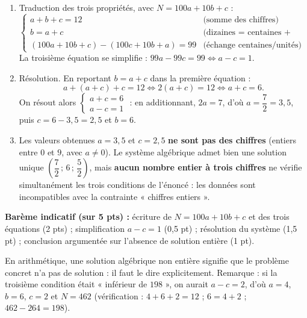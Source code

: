 \documentclass[11pt]{article}
\begin{document}
\begin{corrige}
\begin{enumerate}
\item Traduction des trois propriétés, avec $N = 100a + 10b + c$ :
\[
\begin{cases}
a + b + c = 12 & \text{(somme des chiffres)} \\
b = a + c & \text{(dizaines = centaines + unités)} \\
(100a + 10b + c) - (100c + 10b + a) = 99 & \text{(échange centaines/unités)}
\end{cases}
\]
La troisième équation se simplifie : $99a - 99c = 99 \iff a - c = 1$.
\item Résolution. En reportant $b = a + c$ dans la première équation :
\[
a + (a+c) + c = 12 \iff 2(a+c) = 12 \iff a + c = 6.
\]
On résout alors $\begin{cases} a + c = 6 \\ a - c = 1 \end{cases}$ : en additionnant, $2a = 7$, d'où $a = \dfrac{7}{2} = 3{,}5$, puis $c = 6 - 3{,}5 = 2{,}5$ et $b = 6$.
\item Les valeurs obtenues $a = 3{,}5$ et $c = 2{,}5$ \textbf{ne sont pas des chiffres} (entiers entre $0$ et $9$, avec $a \neq 0$). Le système algébrique admet bien une solution unique $\left(\dfrac{7}{2}\,;\,6\,;\,\dfrac{5}{2}\right)$, mais \textbf{aucun nombre entier à trois chiffres} ne vérifie simultanément les trois conditions de l'énoncé : les données sont incompatibles avec la contrainte « chiffres entiers ».
\end{enumerate}
\textbf{Barème indicatif (sur 5 pts) :} écriture de $N = 100a+10b+c$ et des trois équations (2 pts) ; simplification $a-c=1$ (0,5 pt) ; résolution du système (1,5 pt) ; conclusion argumentée sur l'absence de solution entière (1 pt).
\end{corrige}

\begin{attention}
En arithmétique, une solution algébrique non entière signifie que le problème concret n'a pas de solution : il faut le dire explicitement. Remarque : si la troisième condition était « inférieur de $198$ », on aurait $a - c = 2$, d'où $a = 4$, $b = 6$, $c = 2$ et $N = 462$ (vérification : $4+6+2=12$ ; $6=4+2$ ; $462-264=198$).
\end{attention}

\newpage
\end{document}
